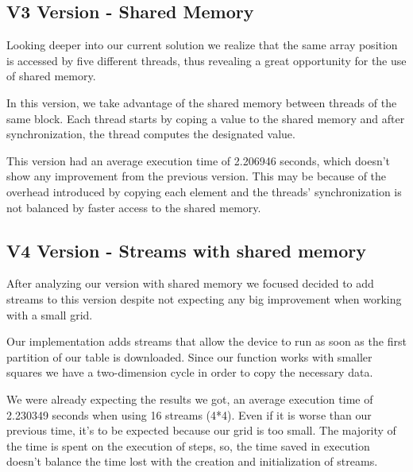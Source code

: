 \documentclass[conference]{IEEEtran}
\begin{document}


\subsection{V3 Version - Shared Memory}
Looking deeper into our current solution we realize that the same array position is accessed by five different threads, thus revealing a great opportunity for the use of shared memory.

In this version, we take advantage of the shared memory between threads of the same block. Each thread starts by coping a value to the shared memory and after synchronization, the thread computes the designated value.

This version had an average execution time of 2.206946 seconds, which doesn't show any improvement from the previous version. This may be because of the overhead introduced by copying each element and the threads' synchronization is not balanced by faster access to the shared memory.

\subsection{V4 Version - Streams with shared memory}
After analyzing our version with shared memory we focused decided to add streams to this version despite not expecting any big improvement when working with a small grid.

Our implementation adds streams that allow the device to run as soon as the first partition of our table is downloaded. Since our function works with smaller squares we have a two-dimension cycle in order to copy the necessary data.

We were already expecting the results we got, an average execution time of 2.230349 seconds when using 16 streams (4*4). Even if it is worse than our previous time, it's to be expected because our grid is too small. The majority of the time is spent on the execution of steps, so, the time saved in execution doesn't balance the time lost with the creation and initialization of streams.
\end{document}
